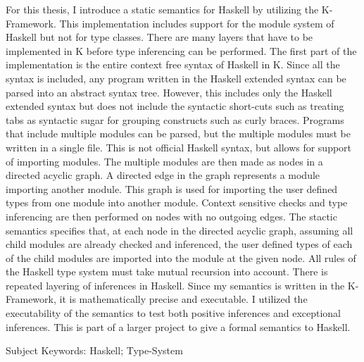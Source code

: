 For this thesis, I introduce a static semantics for Haskell by utilizing the K-Framework. This implementation includes support for the module system of Haskell but not for type classes. There are many layers that have to be implemented in K before type inferencing can be performed. The first part of the implementation is the entire context free syntax of Haskell in K. Since all the syntax is included, any program written in the Haskell extended syntax can be parsed into an abstract syntax tree. However, this includes only the Haskell extended syntax 
but does not include the syntactic short-cuts such as treating tabs as syntactic sugar for grouping constructs such as curly braces.
Programs that include multiple modules can be parsed, but the multiple modules must be written in a single file. This is not official Haskell syntax, but allows for support of importing modules. The multiple modules are then made as nodes in a directed acyclic graph. A directed edge in the graph represents a module importing another module. This graph is used for importing the user defined types from one module into another module. Context sensitive checks and type inferencing are then performed on nodes with no outgoing edges. The stactic semantics specifies that, at each node in the directed acyclic graph, assuming all child modules are already checked and inferenced, the user defined types of each of the child modules are imported into the module at the given node. All rules of the Haskell type system must take mutual recursion into account. There is repeated layering of inferences in Haskell. Since my semantics is written in the K-Framework, it is mathematically precise and executable. I utilized the executability of the semantics to test both positive inferences and exceptional inferences. This is part of a larger project to give a formal semantics to Haskell.

Subject Keywords: Haskell; Type-System
